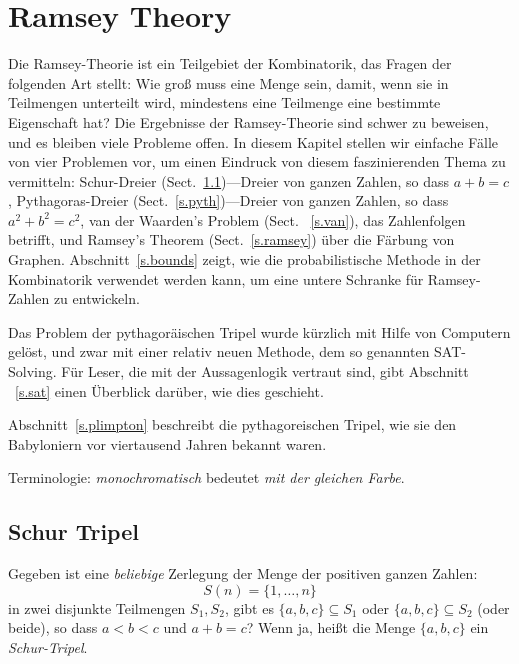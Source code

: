 
\chapter{Ramsey Theory}\label{c.ramsey}


Die Ramsey-Theorie ist ein Teilgebiet der Kombinatorik, das Fragen der folgenden Art stellt: Wie groß muss eine Menge sein, damit, wenn sie in Teilmengen unterteilt wird, mindestens eine Teilmenge eine bestimmte Eigenschaft hat?
Die Ergebnisse der Ramsey-Theorie sind schwer zu beweisen, und es bleiben viele Probleme offen. In diesem Kapitel stellen wir einfache Fälle von vier Problemen vor, um einen Eindruck von diesem faszinierenden Thema zu vermitteln: Schur-Dreier (Sect.~\ref{s.schur})---Dreier von ganzen Zahlen, so dass $a+b=c$, Pythagoras-Dreier (Sect.~\ref{s.pyth})---Dreier von ganzen Zahlen, so dass $a^2+b^2=c^2$, van der Waarden's Problem (Sect. ~\ref{s.van}), das Zahlenfolgen betrifft, und Ramsey's Theorem (Sect.~\ref{s.ramsey}) über die Färbung von Graphen. Abschnitt~\ref{s.bounds} zeigt, wie die probabilistische Methode in der Kombinatorik verwendet werden kann, um eine untere Schranke für Ramsey-Zahlen zu entwickeln.

Das Problem der pythagoräischen Tripel wurde kürzlich mit Hilfe von Computern gelöst, und zwar mit einer relativ neuen Methode, dem so genannten SAT-Solving. Für Leser, die mit der Aussagenlogik vertraut sind, gibt Abschnitt ~\ref{s.sat} einen Überblick darüber, wie dies geschieht.

Abschnitt~\ref{s.plimpton} beschreibt die pythagoreischen Tripel, wie sie den Babyloniern vor viertausend Jahren bekannt waren.

Terminologie: \emph{monochromatisch} bedeutet \emph{mit der gleichen Farbe}.

\section{Schur Tripel}\label{s.schur}

\begin{definition}
Gegeben ist eine \emph{beliebige} Zerlegung der Menge der positiven ganzen Zahlen:
\[
S(n)=\{1,\ldots,n\}
\]
in zwei disjunkte Teilmengen $S_1,S_2$, gibt es $\{a,b,c\}\subseteq S_1$ oder $\{a,b,c\}\subseteq S_2$ (oder beide), so dass $a\!<\!b\!<\!c$ und $a+b=c$? Wenn ja, heißt die Menge $\{a,b,c\}$ ein \emph{Schur-Tripel}.
\end{definition}

